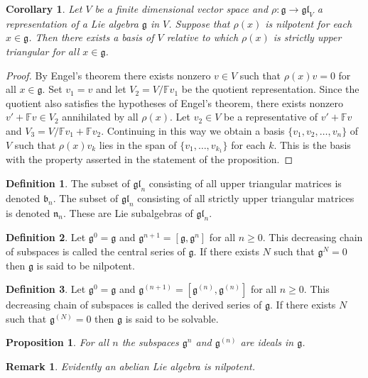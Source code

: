 \documentclass[12pt]{article}
\theoremstyle{plain}
\newtheorem{prop}[thm]{Proposition}
\newtheorem{cor}[thm]{Corollary}
\newtheorem{rem}[thm]{Remark}
\theoremstyle{definition}
\newtheorem{defn}{Definition}[section]
\numberwithin{equation}{section}
\newcommand{\F}{\mathbb{F}}
\newcommand{\fb}{\mathfrak{b}}
\newcommand{\g}{\mathfrak{g}}
\newcommand{\n}{\mathfrak{n}}
\newcommand{\gll}{\mathfrak{gl}}
\begin{document}
\begin{cor}
Let $V$ be a finite dimensional vector space and $\rho : \g \rightarrow \gll_V$ a representation of a Lie algebra $\g$ in $V$. Suppose that $\rho(x)$ is nilpotent for each $x \in \g$. Then there exists a basis of $V$ relative to which $\rho(x)$ is strictly upper triangular for all $x \in \g$.
\end{cor}

\begin{proof}
By Engel's theorem there exists nonzero $v \in V$ such that $\rho(x)v = 0$ for all $x \in \g$. Set $v_1 = v$ and let $V_2 = V / \F v_1$ be the quotient representation. Since the quotient also satisfies the hypotheses of Engel's theorem, there exists nonzero $v' + \F v \in V_2$ annihilated by all $\rho(x)$. Let $v_2 \in V$ be a representative of $v'+\F v$ and $V_3 = V / \F v_1 + \F v_2$. Continuing in this way we obtain a basis $\{v_1, v_2, \ldots, v_n\}$ of $V$ such that $\rho(x)v_k$ lies in the span of $\{v_1, \ldots, v_{k_1}\}$ for each $k$. This is the basis with the property asserted in the statement of the proposition.
\end{proof}

\begin{defn}
The subset of $\gll_n$ consisting of all upper triangular matrices is denoted $\fb_n$. The subset of $\gll_n$ consisting of all strictly upper triangular matrices is denoted $\n_n$. These are Lie subalgebras of $\gll_n$.
\end{defn}

\begin{defn}
Let $\g^0 = \g$ and $\g^{n+1} = [\g, \g^n]$ for all $n \geq 0$. This decreasing chain of subspaces is called the central series of $\g$. If there exists $N$ such that $\g^N = 0$ then $\g$ is said to be nilpotent.
\end{defn}

\begin{defn}
Let $\g^0 = \g$ and $\g^{(n+1)} = [\g^{(n)}, \g^{(n)}]$ for all $n \geq 0$. This decreasing chain of subspaces is called the derived series of $\g$. If there exists $N$ such that $\g^{(N)} = 0$ then $\g$ is said to be solvable.
\end{defn}

\begin{prop}
For all $n$ the subspaces $\g^n$ and $\g^{(n)}$ are ideals in $\g$.
\end{prop}

\begin{rem}
Evidently an abelian Lie algebra is nilpotent.
\end{rem}
\end{document}
